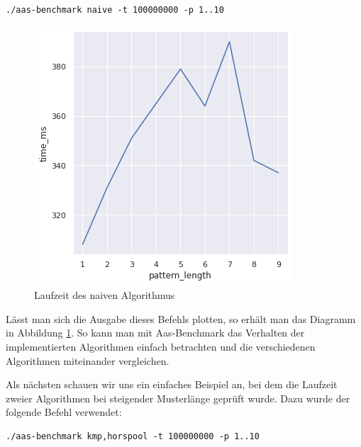\documentclass[twocolumn]{article}
\begin{document}
\begin{lstlisting}[breaklines=true,autogobble=true]
    ./aas-benchmark naive -t 100000000 -p 1..10
\end{lstlisting}

\begin{figure}
    \includegraphics[width=\linewidth]{assets/graph_1.png}
    \caption{Laufzeit des naiven Algorithmus}
    \label{fig:runtime_naive}
\end{figure}

Lässt man sich die Ausgabe dieses Befehls plotten, so erhält man das Diagramm in Abbildung \ref{fig:runtime_naive}. So kann man mit Aas-Benchmark das Verhalten der implementierten Algorithmen einfach betrachten und die verschiedenen Algorithmen miteinander vergleichen.

Als nächsten schauen wir uns ein einfaches Beispiel an, bei dem die Laufzeit zweier Algorithmen bei steigender Musterlänge geprüft wurde. Dazu wurde der folgende Befehl verwendet:

\begin{lstlisting}[breaklines=true,autogobble=true]
    ./aas-benchmark kmp,horspool -t 100000000 -p 1..10
\end{lstlisting}
\end{document}
